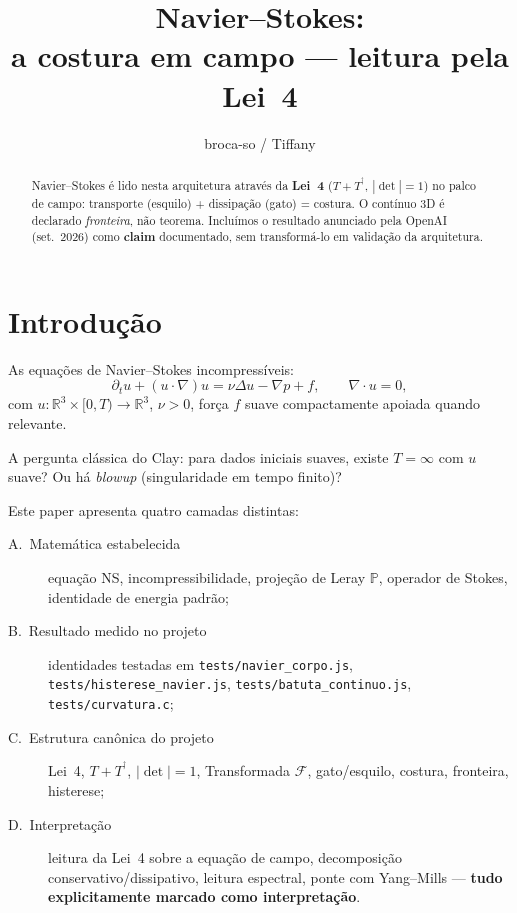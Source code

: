 \documentclass[11pt,a4paper]{article}
\title{Navier--Stokes:\\a costura em campo --- leitura pela Lei~4}
\author{broca-so / Tiffany}
\date{}
\newcommand\code[1]{\texttt{\small #1}}
\newcommand\dg{^{\dagger}}
\begin{document}
\maketitle

\begin{abstract}
Navier--Stokes é lido nesta arquitetura através da
\textbf{Lei~4} ($T+T^{\dg}$, $|\det|=1$) no palco de campo:
transporte (esquilo) + dissipação (gato) = costura.
O contínuo 3D é declarado \emph{fronteira}, não teorema.
Incluímos o resultado anunciado pela OpenAI (set.~2026) como
\textbf{claim} documentado, sem transformá-lo em validação
da arquitetura.
\end{abstract}

\section{Introdução}\label{sec:intro}

As equações de Navier--Stokes incompressíveis:
\begin{equation}\label{eq:NS}
\partial_t u+(u\cdot\nabla)u
=
\nu\Delta u-\nabla p+f,
\qquad
\nabla\cdot u=0,
\end{equation}
com $u:\mathbb R^3\times[0,T)\to\mathbb R^3$,
$\nu>0$, força $f$ suave compactamente apoiada quando relevante.

A pergunta clássica do Clay: para dados iniciais suaves,
existe $T=\infty$ com $u$ suave? Ou há \emph{blowup}
(singularidade em tempo finito)?

Este paper apresenta quatro camadas distintas:

\begin{description}
\item[A.~Matemática estabelecida] equação NS, incompressibilidade,
  projeção de Leray $\mathbb P$, operador de Stokes,
  identidade de energia padrão;
\item[B.~Resultado medido no projeto] identidades testadas em
  \code{tests/navier_corpo.js},
  \code{tests/histerese_navier.js},
  \code{tests/batuta_continuo.js},
  \code{tests/curvatura.c};
\item[C.~Estrutura canônica do projeto] Lei~4, $T+T^{\dg}$,
  $|\det|=1$, Transformada $\mathcal{F}$, gato/esquilo,
  costura, fronteira, histerese;
\item[D.~Interpretação] leitura da Lei~4 sobre a equação de campo,
  decomposição conservativo/dissipativo, leitura espectral,
  ponte com Yang--Mills --- \textbf{tudo explicitamente marcado
  como interpretação}.
\end{description}
\end{document}

